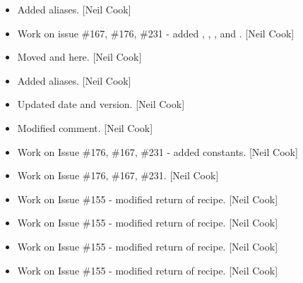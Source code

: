 \documentclass[a4paper,10pt,english]{report}
\begin{document}
\begin{itemize}
\item {} 
Added aliases. {[}Neil Cook{]}

\item {} 
Work on issue \#167, \#176, \#231 - added ,
, , and
. {[}Neil Cook{]}

\item {} 
Moved  and  here.
{[}Neil Cook{]}

\item {} 
Added aliases. {[}Neil Cook{]}

\item {} 
Updated date and version. {[}Neil Cook{]}

\item {} 
Modified comment. {[}Neil Cook{]}

\item {} 
Work on Issue \#176, \#167, \#231 - added constants. {[}Neil Cook{]}

\item {} 
Work on Issue \#176, \#167, \#231. {[}Neil Cook{]}

\item {} 
Work on Issue \#155 - modified return of recipe. {[}Neil Cook{]}

\item {} 
Work on Issue \#155 - modified return of recipe. {[}Neil Cook{]}

\item {} 
Work on Issue \#155 - modified return of recipe. {[}Neil Cook{]}

\item {} 
Work on Issue \#155 - modified return of recipe. {[}Neil Cook{]}

\end{itemize}
\end{document}
